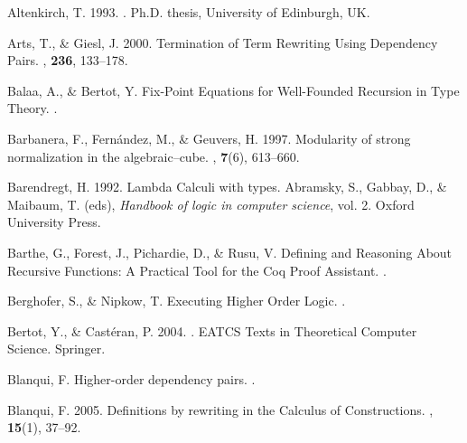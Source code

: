 \begin{thebibliography}{}

Altenkirch, T. 1993.
.
\newblock Ph.D. thesis, University of Edinburgh, UK.

Arts, T., \& Giesl, J. 2000.
\newblock Termination of Term Rewriting Using Dependency Pairs.
, {\bf 236}, 133--178.

Balaa, A., \& Bertot, Y.
\newblock Fix-Point Equations for Well-Founded Recursion in Type Theory.
.

Barbanera, F., Fern{\'a}ndez, M., \& Geuvers, H. 1997.
\newblock Modularity of strong normalization in the algebraic--cube.
, {\bf 7}(6), 613--660.

Barendregt, H. 1992.
\newblock Lambda Calculi with types.
\newblock  Abramsky, S., Gabbay, D., \& Maibaum, T. (eds), {\em
  Handbook of logic in computer science},  vol. 2.
\newblock Oxford University Press.

Barthe, G., Forest, J., Pichardie, D., \& Rusu, V.
\newblock Defining and Reasoning About Recursive Functions: A Practical Tool
  for the {Coq} Proof Assistant.
.

Berghofer, S., \& Nipkow, T.
\newblock Executing Higher Order Logic.
.

Bertot, Y., \& Cast{\'e}ran, P. 2004.
.
\newblock EATCS Texts in Theoretical Computer Science.
\newblock Springer.

Blanqui, F.
\newblock Higher-order dependency pairs.
.

Blanqui, F. 2005.
\newblock Definitions by rewriting in the Calculus of Constructions.
, {\bf 15}(1), 37--92.


\end{thebibliography}
